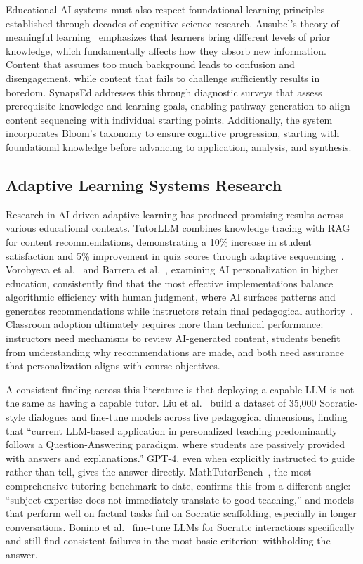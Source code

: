 \documentclass{stylefiles/capstone}
\begin{document}
Educational AI systems must also respect foundational learning principles established through decades of cognitive science research. Ausubel's theory of meaningful learning~\cite{ausubel1978educational} emphasizes that learners bring different levels of prior knowledge, which fundamentally affects how they absorb new information. Content that assumes too much background leads to confusion and disengagement, while content that fails to challenge sufficiently results in boredom. SynapsEd addresses this through diagnostic surveys that assess prerequisite knowledge and learning goals, enabling pathway generation to align content sequencing with individual starting points. Additionally, the system incorporates Bloom's taxonomy to ensure cognitive progression, starting with foundational knowledge before advancing to application, analysis, and synthesis.

\subsection{Adaptive Learning Systems Research}

Research in AI-driven adaptive learning has produced promising results across various educational contexts. TutorLLM combines knowledge tracing with RAG for content recommendations, demonstrating a 10\% increase in student satisfaction and 5\% improvement in quiz scores through adaptive sequencing~\cite{Li}. Vorobyeva et al.~\cite{Vorobyeva2025} and Barrera et al.~\cite{barrera2024personalized}, examining AI personalization in higher education, consistently find that the most effective implementations balance algorithmic efficiency with human judgment, where AI surfaces patterns and generates recommendations while instructors retain final pedagogical authority~\cite{zhang2024questioncentricmultiexpertscontrastivelearning}. Classroom adoption ultimately requires more than technical performance: instructors need mechanisms to review AI-generated content, students benefit from understanding why recommendations are made, and both need assurance that personalization aligns with course objectives.

A consistent finding across this literature is that deploying a capable LLM is not the same as having a capable tutor. Liu et al.~\cite{liu2024socraticlm} build a dataset of 35,000 Socratic-style dialogues and fine-tune models across five pedagogical dimensions, finding that ``current LLM-based application in personalized teaching predominantly follows a Question-Answering paradigm, where students are passively provided with answers and explanations.'' GPT-4, even when explicitly instructed to guide rather than tell, gives the answer directly. MathTutorBench~\cite{macina2025mathtutorbench}, the most comprehensive tutoring benchmark to date, confirms this from a different angle: ``subject expertise does not immediately translate to good teaching,'' and models that perform well on factual tasks fail on Socratic scaffolding, especially in longer conversations. Bonino et al.~\cite{bonino2024euler} fine-tune LLMs for Socratic interactions specifically and still find consistent failures in the most basic criterion: withholding the answer.
\end{document}
